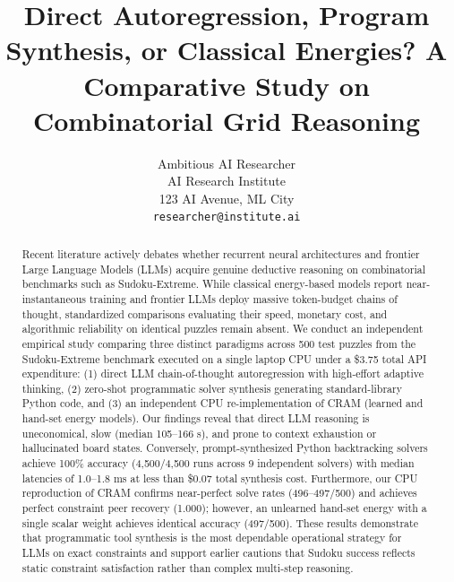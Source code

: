 \documentclass{article} %
\title{Direct Autoregression, Program Synthesis, or Classical Energies? A Comparative Study on Combinatorial Grid Reasoning}
\author{Ambitious AI Researcher\\
AI Research Institute\\
123 AI Avenue, ML City\\
\texttt{researcher@institute.ai}
}
\begin{document}
\maketitle

\begin{abstract}
Recent literature actively debates whether recurrent neural architectures and frontier Large Language Models (LLMs) acquire genuine deductive reasoning on combinatorial benchmarks such as Sudoku-Extreme. While classical energy-based models report near-instantaneous training and frontier LLMs deploy massive token-budget chains of thought, standardized comparisons evaluating their speed, monetary cost, and algorithmic reliability on identical puzzles remain absent. We conduct an independent empirical study comparing three distinct paradigms across 500 test puzzles from the Sudoku-Extreme benchmark executed on a single laptop CPU under a \$3.75 total API expenditure: (1) direct LLM chain-of-thought autoregression with high-effort adaptive thinking, (2) zero-shot programmatic solver synthesis generating standard-library Python code, and (3) an independent CPU re-implementation of CRAM (learned and hand-set energy models). Our findings reveal that direct LLM reasoning is uneconomical, slow (median 105--166 s), and prone to context exhaustion or hallucinated board states. Conversely, prompt-synthesized Python backtracking solvers achieve 100\% accuracy (4,500/4,500 runs across 9 independent solvers) with median latencies of 1.0--1.8 ms at less than \$0.07 total synthesis cost. Furthermore, our CPU reproduction of CRAM confirms near-perfect solve rates (496--497/500) and achieves perfect constraint peer recovery (1.000); however, an unlearned hand-set energy with a single scalar weight achieves identical accuracy (497/500). These results demonstrate that programmatic tool synthesis is the most dependable operational strategy for LLMs on exact constraints and support earlier cautions that Sudoku success reflects static constraint satisfaction rather than complex multi-step reasoning.
\end{abstract}
\end{document}
